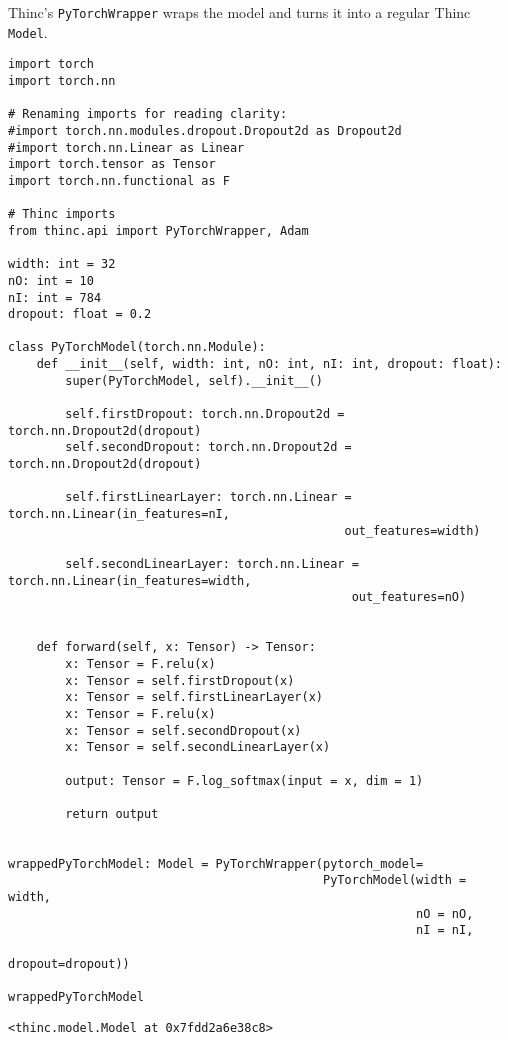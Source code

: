 \documentclass[
]{article}
\begin{document}
Thinc's \texttt{PyTorchWrapper} wraps the model and turns
it into a regular Thinc \texttt{Model}.

\begin{verbatim}
import torch
import torch.nn

# Renaming imports for reading clarity:
#import torch.nn.modules.dropout.Dropout2d as Dropout2d
#import torch.nn.Linear as Linear
import torch.tensor as Tensor
import torch.nn.functional as F

# Thinc imports
from thinc.api import PyTorchWrapper, Adam

width: int = 32
nO: int = 10
nI: int = 784
dropout: float = 0.2

class PyTorchModel(torch.nn.Module):
    def __init__(self, width: int, nO: int, nI: int, dropout: float):
        super(PyTorchModel, self).__init__()

        self.firstDropout: torch.nn.Dropout2d = torch.nn.Dropout2d(dropout)
        self.secondDropout: torch.nn.Dropout2d = torch.nn.Dropout2d(dropout)

        self.firstLinearLayer: torch.nn.Linear = torch.nn.Linear(in_features=nI,
                                               out_features=width)

        self.secondLinearLayer: torch.nn.Linear = torch.nn.Linear(in_features=width,
                                                out_features=nO)


    def forward(self, x: Tensor) -> Tensor:
        x: Tensor = F.relu(x)
        x: Tensor = self.firstDropout(x)
        x: Tensor = self.firstLinearLayer(x)
        x: Tensor = F.relu(x)
        x: Tensor = self.secondDropout(x)
        x: Tensor = self.secondLinearLayer(x)

        output: Tensor = F.log_softmax(input = x, dim = 1)

        return output


wrappedPyTorchModel: Model = PyTorchWrapper(pytorch_model=
                                            PyTorchModel(width = width,
                                                         nO = nO,
                                                         nI = nI,
                                                         dropout=dropout))

wrappedPyTorchModel
\end{verbatim}

\begin{verbatim}
<thinc.model.Model at 0x7fdd2a6e38c8>
\end{verbatim}
\end{document}
